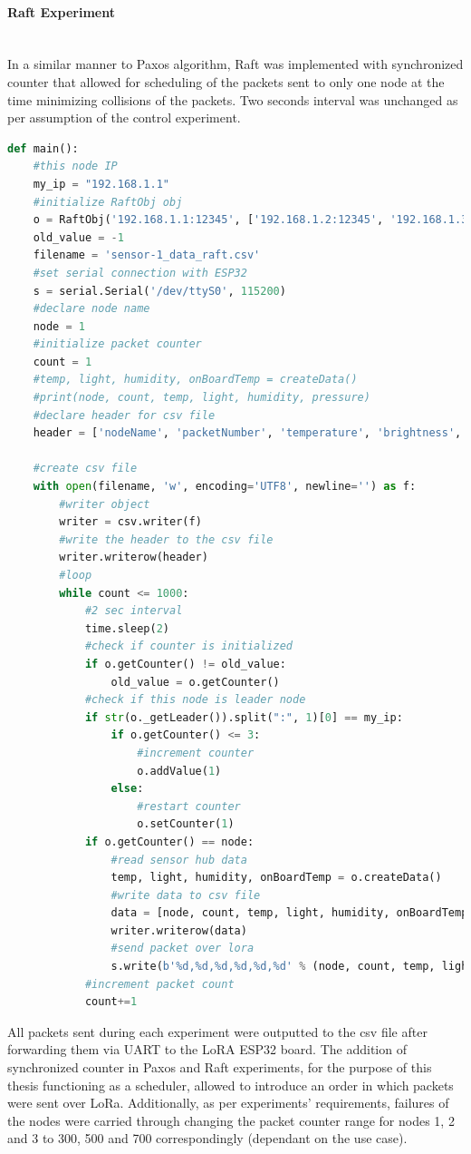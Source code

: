 \documentclass[oneside,12pt]{book}
\newcommand{\myparagraph}[1]{\paragraph{#1}\mbox{}\\}
\begin{document}
\myparagraph{Raft Experiment}
In a similar manner to Paxos algorithm, Raft was implemented with synchronized counter that allowed for scheduling of the packets sent to only one node at the time minimizing collisions of the packets. Two seconds interval was unchanged as per assumption of the control experiment.
\begin{lstlisting}[language=Python, caption=Raft experiment Raspberry Pi code - Python3,captionpos=b ]
def main():
    #this node IP
    my_ip = "192.168.1.1"
    #initialize RaftObj obj
    o = RaftObj('192.168.1.1:12345', ['192.168.1.2:12345', '192.168.1.3:12345'])
    old_value = -1
    filename = 'sensor-1_data_raft.csv'
    #set serial connection with ESP32
    s = serial.Serial('/dev/ttyS0', 115200)
    #declare node name
    node = 1
    #initialize packet counter
    count = 1
    #temp, light, humidity, onBoardTemp = createData()
    #print(node, count, temp, light, humidity, pressure)
    #declare header for csv file
    header = ['nodeName', 'packetNumber', 'temperature', 'brightness', 'humidity', 'onBoardTemp']  
   
    #create csv file
    with open(filename, 'w', encoding='UTF8', newline='') as f:
        #writer object
        writer = csv.writer(f)
        #write the header to the csv file
        writer.writerow(header)
        #loop 
        while count <= 1000:
            #2 sec interval
            time.sleep(2)
            #check if counter is initialized        
            if o.getCounter() != old_value:
                old_value = o.getCounter()
            #check if this node is leader node
            if str(o._getLeader()).split(":", 1)[0] == my_ip:
                if o.getCounter() <= 3: 
                    #increment counter
                    o.addValue(1)
                else:
                    #restart counter
                    o.setCounter(1)
            if o.getCounter() == node:
                #read sensor hub data
                temp, light, humidity, onBoardTemp = o.createData()
                #write data to csv file
                data = [node, count, temp, light, humidity, onBoardTemp]
                writer.writerow(data)
                #send packet over lora
                s.write(b'%d,%d,%d,%d,%d,%d' % (node, count, temp, light, humidity, onBoardTemp)) 
            #increment packet count
            count+=1
\end{lstlisting}
All packets sent during each experiment were outputted to the csv file after forwarding them via UART to the LoRA ESP32 board. The addition of synchronized counter in Paxos and Raft experiments, for the purpose of this thesis functioning as a scheduler, allowed to introduce an order in which packets were sent over LoRa.\smallskip \newline 
Additionally, as per experiments’ requirements, failures of the nodes were carried through changing the packet counter range for nodes 1, 2 and 3 to 300, 500 and 700 correspondingly (dependant on the use case). 
\end{document}

